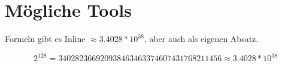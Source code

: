 \chapter{Mögliche Tools}

Formeln gibt es Inline $\approx 3.4028*10^{38}$, aber auch als eigenen Absatz.

\[2^{128} = 340282366920938463463374607431768211456 \approx 3.4028*10^{38}\]
